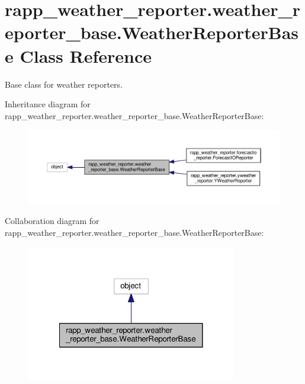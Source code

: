 \hypertarget{classrapp__weather__reporter_1_1weather__reporter__base_1_1WeatherReporterBase}{\section{rapp\-\_\-weather\-\_\-reporter.\-weather\-\_\-reporter\-\_\-base.\-Weather\-Reporter\-Base Class Reference}
\label{classrapp__weather__reporter_1_1weather__reporter__base_1_1WeatherReporterBase}
}


Base class for weather reporters.  




Inheritance diagram for rapp\-\_\-weather\-\_\-reporter.\-weather\-\_\-reporter\-\_\-base.\-Weather\-Reporter\-Base\-:
\nopagebreak
\begin{figure}[H]
\begin{center}
\leavevmode
\includegraphics[width=350pt]{classrapp__weather__reporter_1_1weather__reporter__base_1_1WeatherReporterBase__inherit__graph}
\end{center}
\end{figure}


Collaboration diagram for rapp\-\_\-weather\-\_\-reporter.\-weather\-\_\-reporter\-\_\-base.\-Weather\-Reporter\-Base\-:
\nopagebreak
\begin{figure}[H]
\begin{center}
\leavevmode
\includegraphics[width=260pt]{classrapp__weather__reporter_1_1weather__reporter__base_1_1WeatherReporterBase__coll__graph}
\end{center}
\end{figure}
